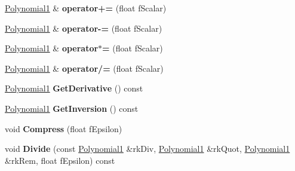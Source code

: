 \begin{DoxyCompactItemize}
\item 
\hyperlink{class_i_dream_sky_1_1_polynomial1}{Polynomial1} \& {\bfseries operator+=} (float f\+Scalar)\hypertarget{class_i_dream_sky_1_1_polynomial1_a01ee07063723596b4fd2a144019a21ef}{}\label{class_i_dream_sky_1_1_polynomial1_a01ee07063723596b4fd2a144019a21ef}

\item 
\hyperlink{class_i_dream_sky_1_1_polynomial1}{Polynomial1} \& {\bfseries operator-\/=} (float f\+Scalar)\hypertarget{class_i_dream_sky_1_1_polynomial1_a81898799c08ec94ec30c6e5199bd00f5}{}\label{class_i_dream_sky_1_1_polynomial1_a81898799c08ec94ec30c6e5199bd00f5}

\item 
\hyperlink{class_i_dream_sky_1_1_polynomial1}{Polynomial1} \& {\bfseries operator$\ast$=} (float f\+Scalar)\hypertarget{class_i_dream_sky_1_1_polynomial1_a5d42cff8ef12f6cf6c0a5123f59ed748}{}\label{class_i_dream_sky_1_1_polynomial1_a5d42cff8ef12f6cf6c0a5123f59ed748}

\item 
\hyperlink{class_i_dream_sky_1_1_polynomial1}{Polynomial1} \& {\bfseries operator/=} (float f\+Scalar)\hypertarget{class_i_dream_sky_1_1_polynomial1_ad16d5787b2835069284ccc26941f66c1}{}\label{class_i_dream_sky_1_1_polynomial1_ad16d5787b2835069284ccc26941f66c1}

\item 
\hyperlink{class_i_dream_sky_1_1_polynomial1}{Polynomial1} {\bfseries Get\+Derivative} () const \hypertarget{class_i_dream_sky_1_1_polynomial1_a47f8fcf613472621ea604c9a7fc1f755}{}\label{class_i_dream_sky_1_1_polynomial1_a47f8fcf613472621ea604c9a7fc1f755}

\item 
\hyperlink{class_i_dream_sky_1_1_polynomial1}{Polynomial1} {\bfseries Get\+Inversion} () const \hypertarget{class_i_dream_sky_1_1_polynomial1_a8e3abc49b94e5bd004bdd025657447d9}{}\label{class_i_dream_sky_1_1_polynomial1_a8e3abc49b94e5bd004bdd025657447d9}

\item 
void {\bfseries Compress} (float f\+Epsilon)\hypertarget{class_i_dream_sky_1_1_polynomial1_a19a5e96867f6ba142575763823591dda}{}\label{class_i_dream_sky_1_1_polynomial1_a19a5e96867f6ba142575763823591dda}

\item 
void {\bfseries Divide} (const \hyperlink{class_i_dream_sky_1_1_polynomial1}{Polynomial1} \&rk\+Div, \hyperlink{class_i_dream_sky_1_1_polynomial1}{Polynomial1} \&rk\+Quot, \hyperlink{class_i_dream_sky_1_1_polynomial1}{Polynomial1} \&rk\+Rem, float f\+Epsilon) const \hypertarget{class_i_dream_sky_1_1_polynomial1_aadc0b98cef6fe2f72af30205499c45ae}{}\label{class_i_dream_sky_1_1_polynomial1_aadc0b98cef6fe2f72af30205499c45ae}

\end{DoxyCompactItemize}
